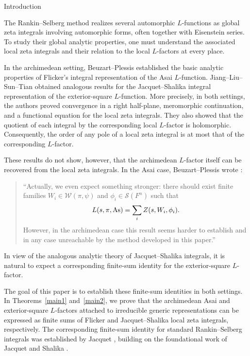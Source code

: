 \documentclass[12pt,reqno]{amsart}
\numberwithin{equation}{section}%
\numberwithin{equation}{subsection}
\theoremstyle{definition}
\theoremstyle{remark}
\begin{document}
\begin{section}{Introduction}\label{s1}

The Rankin--Selberg method realizes several automorphic \(L\)-functions
as global zeta integrals involving automorphic forms, often together with
Eisenstein series. To study their global analytic properties, one must understand the associated local zeta integrals and their relation to the local $L$-factors at every place.

In the archimedean setting, Beuzart--Plessis
\cite[Theorem~1.1]{BP2021} established the basic analytic properties of
Flicker's integral representation \cite{Fli1993} of the Asai
\(L\)-function. Jiang--Liu--Sun--Tian
\cite[Theorem~2.2]{JLST2025} obtained analogous results for the
Jacquet--Shalika integral representation \cite{JS1990} of the
exterior-square \(L\)-function. More precisely, in both settings, the authors proved convergence in a right half-plane, meromorphic continuation, and a functional equation for the local zeta integrals. They also showed that the quotient of each integral by the corresponding local $L$-factor is holomorphic. Consequently, the order of any pole of a local zeta
integral is at most that of the corresponding \(L\)-factor.

These results do not show, however, that the archimedean \(L\)-factor itself
can be recovered from the local zeta integrals. In the Asai case,
Beuzart--Plessis wrote
\cite[p.~5]{BP2021}:
\begin{quote}
``Actually, we even expect something stronger: there should exist finite
families \(W_i\in\mathcal{W}(\pi,\psi)\) and
\(\phi_i\in\mathcal{S}(F^n)\) such that
\[
L(s,\pi,{\rm As})=\sum_i Z(s,W_i,\phi_i).
\]
However, in the archimedean case this result seems harder to establish
and in any case unreachable by the method developed in this paper.''
\end{quote}

In view of the analogous analytic theory of Jacquet--Shalika integrals, it is
natural to expect a corresponding finite-sum identity for the exterior-square
\(L\)-factor.

The goal of this paper is to establish these finite-sum identities in
both settings. In
Theorems~\ref{main1} and~\ref{main2}, we prove that the archimedean Asai and
exterior-square \(L\)-factors attached to irreducible generic
representations can be expressed as finite sums of Flicker and
Jacquet--Shalika local zeta integrals, respectively. 
The corresponding finite-sum identity for standard Rankin--Selberg integrals was established by Jacquet \cite[Theorem~2.6]{Jac2009}, building on the foundational work of Jacquet and Shalika \cite{JS1989}.


\end{section}
\end{document}
